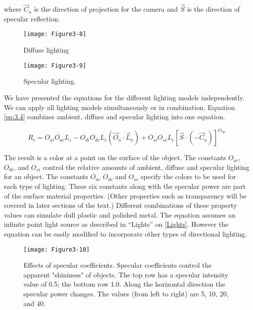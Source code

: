 where $\overrightarrow{C}_n$ is the direction of projection for the camera and $\overrightarrow{S}$ is the direction of specular reflection.

\begin{figure}[!htb]
  \centering
  \texttt{[image: Figure3-8]}\\
  \caption{Diffuse lighting}\label{fig:Figure3-8}
\end{figure}

\begin{figure}[!htb]
  \centering
  \texttt{[image: Figure3-9]}\\
  \caption{Specular lighting.}\label{fig:Figure3-9}
\end{figure}

We have presented the equations for the different lighting models independently. We can apply all lighting models simultaneously or in combination. Equation \ref{eq:3.4} combines ambient, diffuse and specular lighting into one equation.

\begin{equation}\label{eq:3.4}
  R_c = O_{ai}O_{ac}L_c - O_{di}O_{dc}L_c(\overrightarrow{O}_n \cdot \overrightarrow{L}_n) + O_{si}O_{sc}L_c[\overrightarrow{S} \cdot(-\overrightarrow{C}_n)]^{O_{sp}}
\end{equation}


The result is a color at a point on the surface of the object. The constants $O_{ai}$, $O_{di}$, and $O_{si}$ control the relative amounts of ambient, diffuse and specular lighting for an object. The constants $O_{ac}$ $O_{dc}$ and $O_{sc}$ specify the colors to be used for each type of lighting. These six constants along with the specular power are part of the surface material properties. (Other properties such as transparency will be covered in later sections of the text.) Different combinations of these property values can simulate dull plastic and polished metal. The equation assumes an infinite point light source as described in “Lights” on \ref{Lights}. However the equation can be easily modified to incorporate other types of directional lighting.

\begin{figure}[!htb]
  \centering
  \texttt{[image: Figure3-10]}\\
  \caption{Effects of specular coefficients. Specular coefficients control the apparent "shininess" of objects. The top row has a specular intensity value of 0.5; the bottom row 1.0. Along the horizontal direction the specular power changes. The values (from left to right) are 5, 10, 20, and 40.}\label{fig:Figure3-10}
\end{figure}

